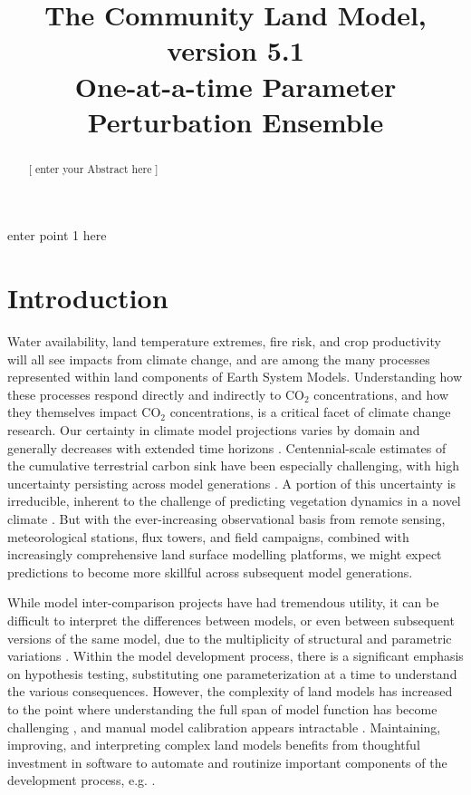 \documentclass[draft]{agujournal2019}
\begin{document}
\title{The Community Land Model, version 5.1 \\ One-at-a-time Parameter Perturbation Ensemble}



\begin{keypoints}
\item enter point 1 here
\end{keypoints}

\begin{abstract}
[ enter your Abstract here ]
\end{abstract}


\section{Introduction}
Water availability, land temperature extremes, fire risk, and crop productivity will all see impacts from climate change, and are among the many processes represented within land components of Earth System Models.
Understanding how these processes respond directly and indirectly to CO$_2$ concentrations, and how they themselves impact CO$_2$ concentrations, is a critical facet of climate change research.  
Our certainty in climate model projections varies by domain and generally decreases with extended time horizons \cite{koven2022}.
Centennial-scale estimates of the cumulative terrestrial carbon sink have been especially challenging, with high uncertainty persisting across model generations \cite{friedlingstein2014,arora2020}. 
A portion of this uncertainty is irreducible, inherent to the challenge of predicting vegetation dynamics in a novel climate \cite{lovenduski2017}.
But with the ever-increasing observational basis from remote sensing, meteorological stations, flux towers, and field campaigns, combined with increasingly comprehensive land surface modelling platforms, we might expect predictions to become more skillful across subsequent model generations.

While model inter-comparison projects have had tremendous utility, it can be difficult to interpret the differences between models, or even between subsequent versions of the same model, due to the multiplicity of structural and parametric variations \cite{mcneall2016}.
Within the model development process, there is a significant emphasis on hypothesis testing, substituting one parameterization at a time to understand the various consequences.
However, the complexity of land models has increased to the point where understanding the full span of model function has become challenging \cite{fisher2020}, and manual model calibration appears intractable \cite{dagon2020}.
Maintaining, improving, and interpreting complex land models benefits from thoughtful investment in software to automate and routinize important components of the development process, e.g. . 
\end{document}
